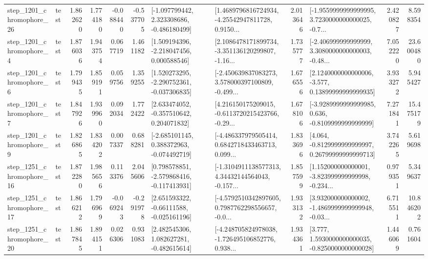 \begin{tabular}{llrrrrllrlrr}
 step\_1201\_chromophore\_26 &      test &      1.862620 &    1.774180 &     -0.088440 & -0.537705 &   [-1.097799442, 2.323308686, -0.486180499] &  [1.4689796816724934, -4.25542947811728, 0.9150... &       2.013646 &  [-1.9559999999999995, 3.7230000000000025, -0.7... &            2.420827 &          8.598354 \\
  step\_1201\_chromophore\_4 &      test &      1.876036 &    1.943754 &      0.067719 &  1.461182 &    [1.509194396, -2.218047456, 0.000588546] &  [2.1086478171899734, -3.351136120299807, -1.16... &       1.735777 &  [-2.406999999999999, 3.3080000000000003, -0.48... &            7.052220 &         23.600480 \\
  step\_1201\_chromophore\_6 &      test &      1.799435 &    1.859191 &      0.059756 &  1.359255 &   [1.520273295, -2.290752361, -0.037306835] &  [-2.450639837083273, 3.578000397100809, -0.499... &       1.676556 &  [2.1240000000000006, -3.577, 0.13899999999999935] &            3.933272 &          5.945427 \\
  step\_1201\_chromophore\_7 &      test &      1.847926 &    1.939960 &      0.092034 &  1.772422 &    [2.633474052, -0.357510642, 0.204071832] &  [4.216150175209015, -0.6113720215423766, -0.29... &       1.678106 &  [-3.9289999999999985, 0.636, -0.8109999999999999] &            7.271841 &         15.475179 \\
  step\_1201\_chromophore\_9 &      test &      1.826865 &    1.834202 &      0.007337 &  0.688281 &   [-2.685101145, 0.388372963, -0.074492719] &  [-4.486337979505414, 0.6842718433463713, 0.099... &       1.833696 &  [4.064, -0.8129999999999997, 0.26799999999999713] &            3.742265 &          5.619698 \\
 step\_1251\_chromophore\_16 &      test &      1.872280 &    1.985656 &      0.113376 &  2.045606 &   [0.798578851, -2.579868416, -0.117413931] &  [-1.3104911138577313, 4.34432144564043, -0.157... &       1.857599 &  [1.152000000000001, -3.823999999999998, -0.234... &            0.979351 &          5.349637 \\
 step\_1251\_chromophore\_17 &      test &      1.866212 &    1.796969 &     -0.069243 & -0.291978 &    [2.651593322, -0.66111588, -0.025161196] &  [-4.5792510342897605, 0.7987762298556657, -0.0... &       1.933132 &  [3.932000000000002, -1.4869999999999948, -0.03... &            6.715511 &         10.846202 \\
 step\_1251\_chromophore\_20 &      test &      1.867845 &    1.894151 &      0.026306 &  0.931083 &    [2.482545306, 1.082627281, -0.482615614] &  [-4.248705824978038, -1.726495106852776, 0.938... &       1.934361 &   [3.777, 1.5930000000000035, -0.8250000000000028] &            1.446069 &          0.761604 \\

\end{tabular}

